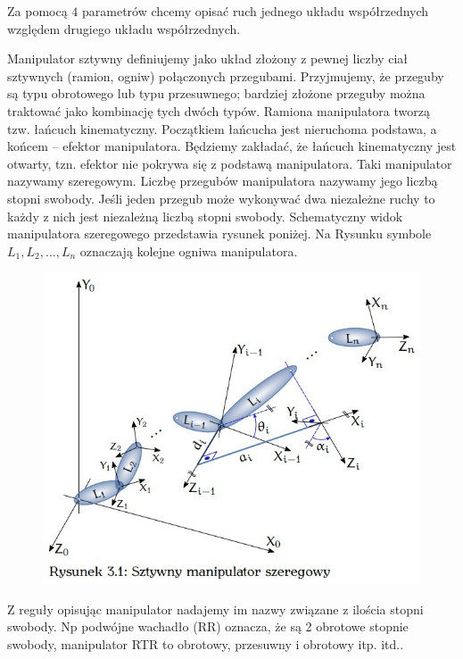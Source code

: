 \documentclass{article}
\begin{document}
Za pomocą $4$ parametrów chcemy opisać ruch jednego układu współrzednych względem drugiego układu współrzednych.


\newpage

Manipulator sztywny definiujemy jako układ złożony z pewnej liczby
ciał sztywnych (ramion, ogniw) połączonych przegubami. Przyjmujemy,
że przeguby są typu obrotowego lub typu przesuwnego; bardziej złożone
przeguby można traktować jako kombinację tych dwóch typów. Ramiona manipulatora tworzą tzw. łańcuch kinematyczny. Początkiem łańcucha jest nieruchoma podstawa, a końcem – efektor manipulatora. Będziemy zakładać, że łańcuch kinematyczny jest otwarty, tzn. efektor nie
pokrywa się z podstawą manipulatora. Taki manipulator nazywamy szeregowym. Liczbę przegubów manipulatora nazywamy jego liczbą stopni
swobody. Jeśli jeden przegub może wykonywać dwa niezależne ruchy to każdy z nich jest niezależną liczbą stopni swobody. Schematyczny widok manipulatora szeregowego przedstawia rysunek poniżej. Na Rysunku symbole $L_{1}, L_{2}, \dots , L_{n}$ oznaczają kolejne ogniwa manipulatora.


\begin{figure}[h!]
    \centering
    \includegraphics[scale=0.5]{img/manipulator_sz.jpg}
\end{figure}

Z reguły opisując manipulator nadajemy im nazwy związane z ilościa stopni swobody.
Np podwójne wachadło (RR) oznacza, że są 2 obrotowe stopnie swobody, manipulator RTR to obrotowy, przesuwny i obrotowy itp. itd..
\end{document}
